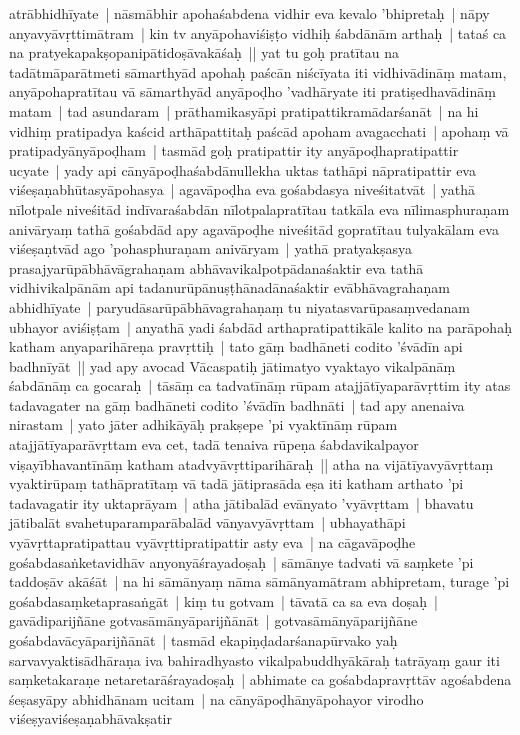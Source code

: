 \documentclass[article,a4paper]{memoir}
\begin{document}
	  \pstart atrā\-bhidhī\-yate | nā\-smā\-bhir apohaśabdena vidhir eva kevalo 'bhipretaḥ | nā\-py anyavyā\-vṛttimā\-tram | kin tv anyā\-pohaviśiṣṭo vidhiḥ śabdā\-nā\-m arthaḥ | tataś ca na pratyekapakṣopanipā\-tidoṣā\-vakā\-śaḥ || \label{thakur75-59.7} yat tu goḥ pratī\-tau na tadā\-tmā\-parā\-tmeti sā\-marthyā\-d apohaḥ paścā\-n niścī\-yata iti vidhivā\-dinā\-ṃ matam, anyā\-pohapratī\-tau vā\- sā\-marthyā\-d anyā\-poḍho 'vadhā\-ryate iti pratiṣedhavā\-dinā\-ṃ matam | tad asundaram | prā\-thamikasyā\-pi pratipattikramā\-darśanā\-t | na hi vidhiṃ pratipadya kaścid arthā\-pattitaḥ paścā\-d apoham avagacchati | apohaṃ vā\- pratipadyā\-nyā\-poḍham | tasmā\-d goḥ pratipattir ity anyā\-poḍhapratipattir ucyate | yady api cā\-nyā\-poḍhaśabdā\-nullekha uktas tathā\-pi nā\-pratipattir eva viśeṣaṇabhū\-tasyā\-pohasya | agavā\-poḍha eva gośabdasya niveśitatvā\-t | yathā\- nī\-lotpale niveśitā\-d indī\-varaśabdā\-n nī\-lotpalapratī\-tau tatkā\-la eva nī\-limasphuraṇam anivā\-ryaṃ tathā\- gośabdā\-d apy agavā\-poḍhe niveśitā\-d gopratī\-tau tulyakā\-lam eva viśeṣaṇtvā\-d ago 'pohasphuraṇam anivā\-ryam | yathā\- pratyakṣasya prasajyarū\-pā\-bhā\-vā\-grahaṇam abhā\-vavikalpotpā\-danaśaktir eva tathā\- vidhivikalpā\-nā\-m api tadanurū\-pā\-nuṣṭhā\-nadā\-naśaktir evā\-bhā\-vagrahaṇam abhidhī\-yate | paryudā\-sarū\-pā\-bhā\-vagrahaṇaṃ tu niyatasvarū\-pasaṃvedanam ubhayor aviśiṣṭam | anyathā\- yadi śabdā\-d arthapratipattikā\-le kalito na parā\-pohaḥ katham anyaparihā\-reṇa pravṛttiḥ | tato gā\-ṃ badhā\-neti codito 'śvā\-dī\-n api badhnī\-yā\-t || \label{thakur75-59.21} yad apy avocad Vā\-caspatiḥ jā\-timatyo vyaktayo vikalpā\-nā\-ṃ śabdā\-nā\-ṃ ca gocaraḥ | tā\-sā\-ṃ ca tadvatī\-nā\-ṃ rū\-pam atajjā\-tī\-yaparā\-vṛttim ity atas tadavagater na gā\-ṃ badhā\-neti codito 'śvā\-dī\-n badhnā\-ti | tad apy anenaiva nirastam | yato jā\-ter adhikā\-yā\-ḥ prakṣepe 'pi vyaktī\-nā\-ṃ rū\-pam atajjā\-tī\-yaparā\-vṛttam eva cet, tadā\- tenaiva rū\-peṇa śabdavikalpayor viṣayī\-bhavantī\-nā\-ṃ katham atadvyā\-vṛttiparihā\-raḥ || \label{thakur75-59.26} atha na vijā\-tī\-yavyā\-vṛttaṃ vyaktirū\-paṃ tathā\-pratī\-taṃ vā\- tadā\- jā\-tiprasā\-da eṣa iti katham arthato 'pi tadavagatir ity uktaprā\-yam | \label{thakur75-59.28} atha jā\-tibalā\-d evā\-nyato 'vyā\-vṛttam | bhavatu jā\-tibalā\-t svahetuparamparā\-balā\-d vā\-nyavyā\-vṛttam | ubhayathā\-pi vyā\-vṛttapratipattau vyā\-vṛttipratipattir asty eva | \label{thakur75-60.1} na cā\-gavā\-poḍhe gośabdasaṅketavidhā\-v anyonyā\-śrayadoṣaḥ | sā\-mā\-nye tadvati vā\- saṃkete 'pi taddoṣā\-v akā\-śā\-t | na hi sā\-mā\-nyaṃ nā\-ma sā\-mā\-nyamā\-tram abhipretam, turage 'pi gośabdasaṃketaprasaṅgā\-t | kiṃ tu gotvam | tā\-vatā\- ca sa eva doṣaḥ | gavā\-diparijñā\-ne gotvasā\-mā\-nyā\-parijñā\-nā\-t | gotvasā\-mā\-nyā\-parijñā\-ne gośabdavā\-cyā\-parijñā\-nā\-t | \label{thakur75-60.6} tasmā\-d ekapiṇḍadarśanapū\-rvako yaḥ sarvavyaktisā\-dhā\-raṇa iva bahiradhyasto vikalpabuddhyā\-kā\-raḥ tatrā\-yaṃ gaur iti saṃketakaraṇe netaretarā\-śrayadoṣaḥ | \label{thakur75-60.8} abhimate ca gośabdapravṛttā\-v agośabdena śeṣasyā\-py abhidhā\-nam ucitam | na cā\-nyā\-poḍhā\-nyā\-pohayor virodho viśeṣyaviśeṣaṇabhā\-vakṣatir 
\end{document}
